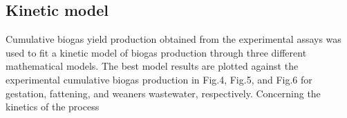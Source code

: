 \subsection{Kinetic model}
Cumulative biogas yield production obtained from the experimental assays was used to fit a kinetic model of biogas production through three different mathematical models. The best model results are plotted against the experimental cumulative biogas production in Fig.4, Fig.5, and Fig.6 for gestation, fattening, and weaners wastewater, respectively.
Concerning the kinetics of the process